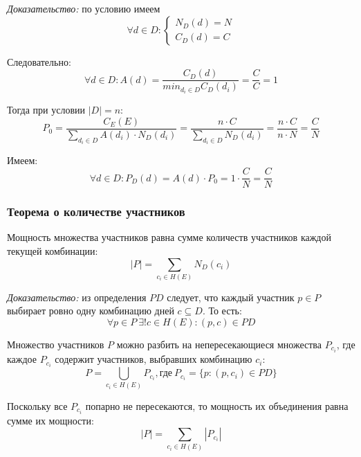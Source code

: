 \textit{Доказательство:} по условию имеем
\begin{equation}
	\forall d \in D:
	\begin{cases}
		N_D(d) = N \\
		C_D(d) = C
	\end{cases}
\end{equation}

Следовательно:
\begin{equation}
	\forall d \in D: A(d) = \frac{C_D(d)}{min_{d_i \in D}{C_D(d_i)}} = \frac{C}{C} = 1
\end{equation}

Тогда при условии $|D| = n$:
\begin{equation}
	P_0 = \frac{C_E(E)}{\sum_{d_i \in D}{A(d_i) \cdot N_D(d_i)}} = \frac{n \cdot C}{\sum_{d_i \in D}{N_D(d_i)}} = \frac{n \cdot C}{n \cdot N} = \frac{C}{N}
\end{equation}

Имеем:
\begin{equation}
	\forall d \in D: P_D(d) = A(d) \cdot P_0 = 1 \cdot \frac{C}{N} = \frac{C}{N}
\end{equation}

\subsubsection{Теорема о количестве участников}

Мощность множества участников равна сумме количеств участников каждой текущей комбинации:
\begin{equation}
	|P| = \sum_{c_i \in H(E)}{N_D(c_i)}
\end{equation}

\textit{Доказательство:} из определения $PD$ следует, что каждый участник \newline $p \in P$ выбирает ровно одну комбинацию дней $c \subseteq D$. То есть:
\begin{equation}
	\forall p \in P \ \exists! c \in H(E): (p, c) \in PD
\end{equation}

Множество участников $P$ можно разбить на непересекающиеся множества $P_{c_i}$, где каждое $P_{c_i}$ содержит участников, выбравших комбинацию $c_i$:
\begin{equation}
	P = \bigcup_{c_i \in H(E)}{P_{c_i}}, \text{где} \ P_{c_i} = \{p: (p, c_i) \in PD\}
\end{equation}

Поскольку все $P_{c_i}$ попарно не пересекаются, то мощность их объединения равна сумме их мощности:
\begin{equation}
	|P| = \sum_{c_i \in H(E)}{|P_{c_i}|}
\end{equation}

